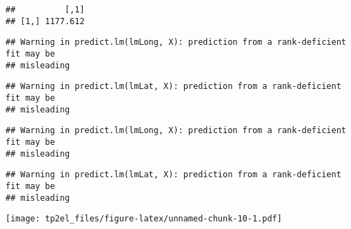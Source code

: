 \documentclass[
]{article}
\begin{document}
\begin{verbatim}
##          [,1]
## [1,] 1177.612
\end{verbatim}

\begin{verbatim}
## Warning in predict.lm(lmLong, X): prediction from a rank-deficient fit may be
## misleading
\end{verbatim}

\begin{verbatim}
## Warning in predict.lm(lmLat, X): prediction from a rank-deficient fit may be
## misleading
\end{verbatim}

\begin{verbatim}
## Warning in predict.lm(lmLong, X): prediction from a rank-deficient fit may be
## misleading
\end{verbatim}

\begin{verbatim}
## Warning in predict.lm(lmLat, X): prediction from a rank-deficient fit may be
## misleading
\end{verbatim}

\texttt{[image: tp2el\_files/figure-latex/unnamed-chunk-10-1.pdf]}
\end{document}
